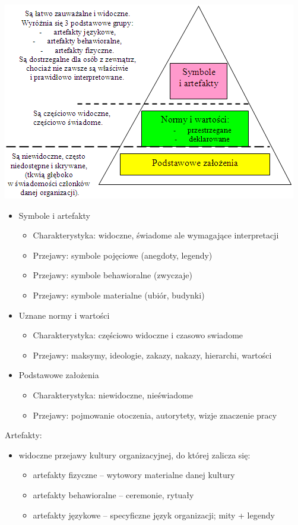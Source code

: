 \documentclass[a4paper,10pt]{report}
\begin{document}
\includegraphics[scale=0.5]{assets/poziomy}
\begin{itemize}
	\item Symbole i artefakty
	\begin{itemize}
		\item Charakterystyka: widoczne, świadome ale wymagające interpretacji
		\item Przejawy: symbole pojęciowe (anegdoty, legendy)
		\item Przejawy: symbole behawioralne (zwyczaje)
		\item Przejawy: symbole materialne (ubiór, budynki)
	\end{itemize}
	\item Uznane normy i wartości
	\begin{itemize}
		\item Charakterystyka: częściowo widoczne i czasowo swiadome
		\item Przejawy: maksymy, ideologie, zakazy, nakazy, hierarchi, wartości
	\end{itemize}
	\item Podstawowe założenia
	\begin{itemize}
		\item Charakterystyka: niewidoczne, nieświadome
		\item Przejawy: pojmowanie otoczenia, autorytety, wizje znaczenie pracy	
	\end{itemize}
\end{itemize}

\noindent Artefakty:
\begin{itemize}
	\item widoczne przejawy kultury organizacyjnej, do której zalicza się:
	\begin{itemize}
		\item artefakty fizyczne -- wytowory materialne danej kultury
		\item artefakty behawioralne -- ceremonie, rytuały
		\item artefakty językowe -- specyficzne język organizacji; mity + legendy
	\end{itemize}
\end{itemize}
\end{document}
